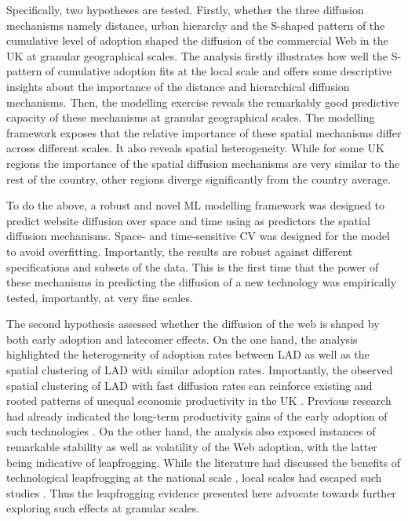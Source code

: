 \documentclass[
  authoryear,
  preprint,
  3p]{elsarticle}
\begin{document}
Specifically, two hypotheses are tested. Firstly, whether the three
diffusion mechanisms namely distance, urban hierarchy and the S-shaped
pattern of the cumulative level of adoption shaped the diffusion of the
commercial Web in the UK at granular geographical scales. The analysis
firstly illustrates how well the S-pattern of cumulative adoption fits
at the local scale and offers some descriptive insights about the
importance of the distance and hierarchical diffusion mechanisms. Then,
the modelling exercise reveals the remarkably good predictive capacity
of these mechanisms at granular geographical scales. The modelling
framework exposes that the relative importance of these spatial
mechanisms differ across different scales. It also reveals spatial
heterogeneity. While for some UK regions the importance of the spatial
diffusion mechanisms are very similar to the rest of the country, other
regions diverge significantly from the country average.

To do the above, a robust and novel ML modelling framework was designed
to predict website diffusion over space and time using as predictors the
spatial diffusion mechanisms. Space- and time-sensitive CV was designed
for the model to avoid overfitting. Importantly, the results are robust
against different specifications and subsets of the data. This is the
first time that the power of these mechanisms in predicting the
diffusion of a new technology was empirically tested, importantly, at
very fine scales.

The second hypothesis assessed whether the diffusion of the web is
shaped by both early adoption and latecomer effects. On the one hand,
the analysis highlighted the heterogeneity of adoption rates between LAD
as well as the spatial clustering of LAD with similar adoption rates.
Importantly, the observed spatial clustering of LAD with fast diffusion
rates can reinforce existing and rooted patterns of unequal economic
productivity in the UK \citep{mccann2022productivity}. Previous research
had already indicated the long-term productivity gains of the early
adoption of such technologies \citep{tranosuk}. On the other hand, the
analysis also exposed instances of remarkable stability as well as
volatility of the Web adoption, with the latter being indicative of
leapfrogging. While the literature had discussed the benefits of
technological leapfrogging at the national scale
\citep{teece2008firm, perkins2005international}, local scales had
escaped such studies \citep{yu2018sustainability}. Thus the leapfrogging
evidence presented here advocate towards further exploring such effects
at granular scales.
\end{document}
